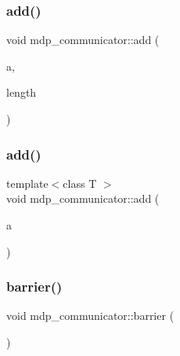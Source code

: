 \mbox{\label{classmdp__communicator_a03e473c3c953f458504fb21872a2a244}} 
\subsubsection{\texorpdfstring{add()}{add()}\hspace{0.1cm}{\footnotesize\ttfamily [14/15]}}
{\footnotesize\ttfamily void mdp\+\_\+communicator\+::add (\begin{DoxyParamCaption}\item[{\hyperlink{classmdp__matrix}{mdp\+\_\+matrix} $\ast$}]{a,  }\item[{\hyperlink{mdp__global__vars_8h_aaa1ad9d0dcd2124aa5af0120d9954174}{mdp\+\_\+int}}]{length }\end{DoxyParamCaption})\hspace{0.3cm}{\ttfamily [inline]}}

\mbox{\label{classmdp__communicator_a146ff6dcc18accdc7c86e6234394e040}} 
\subsubsection{\texorpdfstring{add()}{add()}\hspace{0.1cm}{\footnotesize\ttfamily [15/15]}}
{\footnotesize\ttfamily template$<$class T $>$ \\
void mdp\+\_\+communicator\+::add (\begin{DoxyParamCaption}\item[{vector$<$ T $>$ \&}]{a }\end{DoxyParamCaption})\hspace{0.3cm}{\ttfamily [inline]}}

\mbox{\label{classmdp__communicator_a46a0990eb357e60a6768c706a2aaf272}} 
\subsubsection{\texorpdfstring{barrier()}{barrier()}}
{\footnotesize\ttfamily void mdp\+\_\+communicator\+::barrier (\begin{DoxyParamCaption}{ }\end{DoxyParamCaption})\hspace{0.3cm}{\ttfamily [inline]}}

